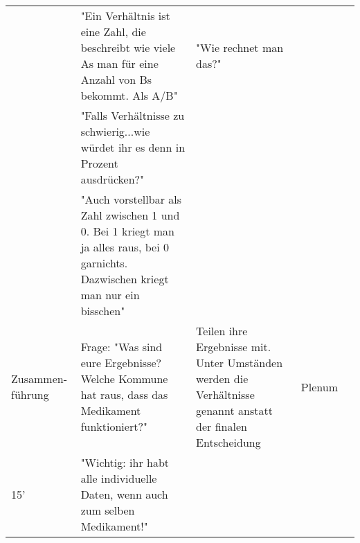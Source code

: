 \documentclass{article}
\begin{document}
\begin{tabularx}{\textwidth}{|X|X|X|X|X|}
                              & "Ein Verhältnis ist eine Zahl, die beschreibt wie viele As man für eine Anzahl von Bs bekommt. Als A/B"                                                                                                                           & "Wie rechnet man das?"                                                                                                      &                                                                                          &                                                                             \\
                              & "Falls Verhältnisse zu schwierig...wie würdet ihr es denn in Prozent ausdrücken?"                                                                                                                                                 &                                                                                                                             &                                                                                          &                                                                             \\
                              & "Auch vorstellbar als Zahl zwischen 1 und 0. Bei 1 kriegt man ja alles raus, bei 0 garnichts. Dazwischen kriegt man nur ein bisschen"                                                                                             &                                                                                                                             &                                                                                          &                                                                             \\ \hline
Zusammen- führung               & Frage: "Was sind eure Ergebnisse? Welche Kommune hat raus, dass das Medikament funktioniert?"                                                                                                                                     & Teilen ihre Ergebnisse mit. Unter Umständen werden die Verhältnisse genannt anstatt der finalen Entscheidung                & Plenum                                                                                   &                                                                             \\
15'                           & "Wichtig: ihr habt alle individuelle Daten, wenn auch zum selben Medikament!"                                                                                                                                                     &                                                                                                                             &                                                                                          &                                                                             \\

\end{tabularx}
\end{document}
